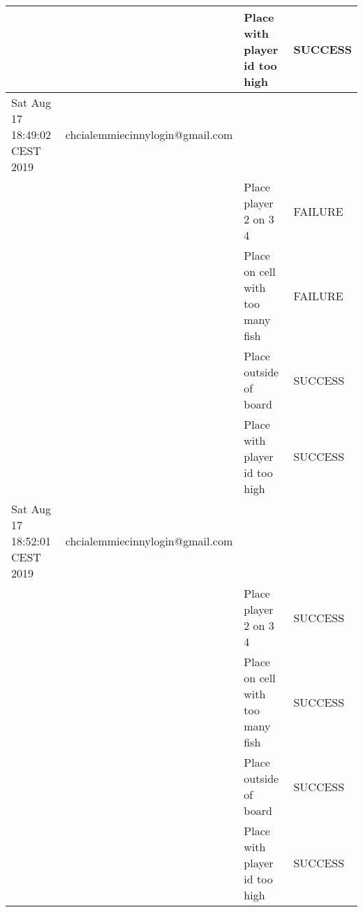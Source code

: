 \begin{center}
\begin{longtable}{|l|l|l|l|}
        &                                 & Place with player id too high    & SUCCESS         \\ \hline
        Sat Aug 17 18:49:02 CEST 2019 & chcialemmiecinnylogin@gmail.com &                                  &                 \\ \hline
        &                                 & Place player 2 on 3 4            & FAILURE         \\ \hline
        &                                 & Place on cell with too many fish & FAILURE         \\ \hline
        &                                 & Place outside of board           & SUCCESS         \\ \hline
        &                                 & Place with player id too high    & SUCCESS         \\ \hline
        Sat Aug 17 18:52:01 CEST 2019 & chcialemmiecinnylogin@gmail.com &                                  &                 \\ \hline
        &                                 & Place player 2 on 3 4            & SUCCESS         \\ \hline
        &                                 & Place on cell with too many fish & SUCCESS         \\ \hline
        &                                 & Place outside of board           & SUCCESS         \\ \hline
        &                                 & Place with player id too high    & SUCCESS         \\ \hline
    \end{longtable}
\end{center}

\normalsize